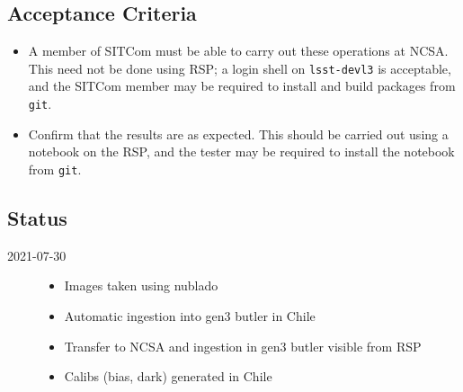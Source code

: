 \subsection{Acceptance Criteria}
\begin{itemize}
\item A member of SITCom must be able to carry out these operations at NCSA.
  This need not be done using RSP; a login shell on \eg \texttt{lsst-devl3} is acceptable, and
  the SITCom member may be required to install and build packages from \texttt{git}.
\item Confirm that the results are as expected.  This should be carried out using a notebook on the RSP,
  and the tester may be required to install the notebook from \texttt{git}.
\end{itemize}

\subsection{Status}

\begin{description}
   \item[2021-07-30]
        \begin{itemize}
                \item Images taken using nublado
                \item Automatic ingestion into gen3 butler in Chile
                \item Transfer to NCSA and ingestion in gen3 butler visible from \gls{RSP}
                \item Calibs (bias, dark) generated in Chile
        \end{itemize}
   \end{description}
        
